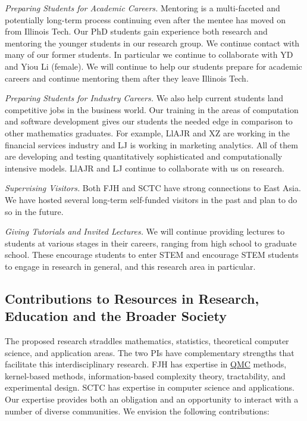 \documentclass[11pt]{NSFamsart}
\newcommand{\QMC}{\hyperlink{QMClink}{QMC}\xspace}
\begin{document}
\emph{Preparing Students for Academic Careers.} Mentoring is a multi-faceted and 
potentially long-term process continuing even after the mentee has moved on from Illinois Tech.  
Our PhD students gain experience both research and mentoring the younger students in our 
research group.  We 
continue contact with many of our former students.  In particular we continue to 
collaborate with YD and Yiou Li (female).  We will continue to help our students prepare for 
academic careers and continue mentoring them after they leave Illinois Tech.

\emph{Preparing Students for Industry Careers.}
We also help current students land 
competitive jobs in the business world. Our training in the areas of computation and software 
development gives our students the needed edge in comparison to other mathematics 
graduates. For example, LlAJR and XZ are working in the financial services industry and  LJ is 
working in marketing analytics.  All of them are developing and testing quantitatively sophisticated 
and computationally intensive models.  LlAJR and LJ continue to collaborate with us on research.

\emph{Supervising Visitors.}
Both FJH and SCTC have strong connections to East Asia.  We have hosted several long-term 
self-funded visitors in the past and plan to do so in the future.

\emph{Giving Tutorials and Invited Lectures.}
We will continue providing lectures to students at various stages in their careers, ranging from high
school to graduate school. These encourage students to enter STEM and encourage STEM students 
to engage in research in general, and this research area in particular.


\subsection{Contributions to Resources in Research, Education and the Broader Society} 
\label{BroaderTwoSec}

The proposed research straddles mathematics, statistics, theoretical computer science, and 
application areas.  The two PIs have complementary strengths that facilitate this interdisciplinary research.  FJH 
has expertise in \QMC methods, kernel-based methods, information-based complexity 
theory, tractability, and experimental design. SCTC has expertise in computer science and applications.  Our 
expertise provides both an obligation and an opportunity to interact with a number of diverse 
communities. We envision the following contributions:
\end{document}
